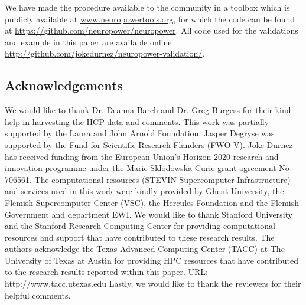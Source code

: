 We have made the procedure available to the community in a toolbox which is publicly available at \url{www.neuropowertools.org}, for which the code can be found at \url{https://github.com/neuropower/neuropower}.  All code used for the validations and example in this paper are available online \url{http://github.com/jokedurnez/neuropower-validation/}.

\subsection*{Acknowledgements}
We would like to thank Dr. Deanna Barch and Dr. Greg Burgess for their kind help in harvesting the HCP data and comments.
This work was partially supported by the Laura and John Arnold Foundation.  Jasper Degryse was supported by the Fund for Scientific Research-Flanders (FWO-V).  Joke Durnez has received funding from the European Union’s Horizon 2020 research and innovation programme under the Marie Sklodowska-Curie grant agreement No 706561.
The computational resources (STEVIN Supercomputer Infrastructure) and services used in this work were kindly provided by Ghent University, the Flemish Supercomputer Center (VSC), the Hercules Foundation and the Flemish Government and department EWI.
We would like to thank Stanford University and the Stanford Research Computing Center for providing computational resources and support that have contributed to these research results.
The authors acknowledge the Texas Advanced Computing Center (TACC) at The University of Texas at Austin for providing HPC resources that have contributed to the research results reported within this paper. URL: http://www.tacc.utexas.edu
Lastly, we would like to thank the reviewers for their helpful comments.
